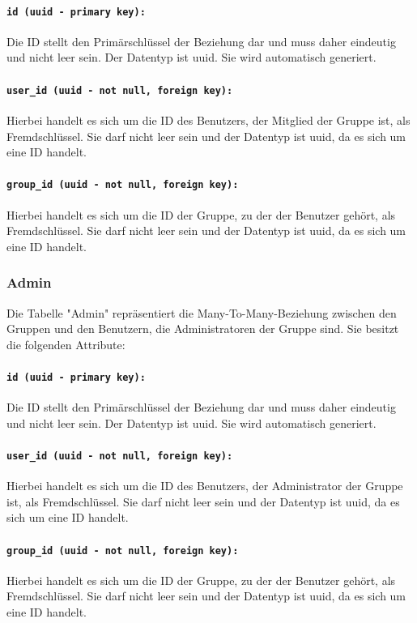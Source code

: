 \documentclass{entwurfsheft}
\begin{document}
\paragraph{\texttt{id (uuid - primary key):}} Die ID stellt den Primärschlüssel der Beziehung dar und muss daher eindeutig und nicht leer sein. Der Datentyp ist \Gls{uuid}. Sie wird automatisch generiert.
\paragraph{\texttt{user\_id (uuid - not null, foreign key):}} Hierbei handelt es sich um die ID des Benutzers, der Mitglied der Gruppe ist, als Fremdschlüssel. Sie darf nicht leer sein und der Datentyp ist \Gls{uuid}, da es sich um eine ID handelt.
\paragraph{\texttt{group\_id (uuid - not null, foreign key):}} Hierbei handelt es sich um die ID der Gruppe, zu der der Benutzer gehört, als Fremdschlüssel. Sie darf nicht leer sein und der Datentyp ist \Gls{uuid}, da es sich um eine ID handelt.
\newpage
\subsubsection{Admin}
Die Tabelle "Admin" repräsentiert die Many-To-Many-Beziehung zwischen den Gruppen und den Benutzern, die Administratoren der Gruppe sind. Sie besitzt die folgenden Attribute:
\paragraph{\texttt{id (uuid - primary key):}} Die ID stellt den Primärschlüssel der Beziehung dar und muss daher eindeutig und nicht leer sein. Der Datentyp ist \Gls{uuid}. Sie wird automatisch generiert.
\paragraph{\texttt{user\_id (uuid - not null, foreign key):}} Hierbei handelt es sich um die ID des Benutzers, der Administrator der Gruppe ist, als Fremdschlüssel. Sie darf nicht leer sein und der Datentyp ist \Gls{uuid}, da es sich um eine ID handelt.
\paragraph{\texttt{group\_id (uuid - not null, foreign key):}} Hierbei handelt es sich um die ID der Gruppe, zu der der Benutzer gehört, als Fremdschlüssel. Sie darf nicht leer sein und der Datentyp ist \Gls{uuid}, da es sich um eine ID handelt.
\newpage
\end{document}
